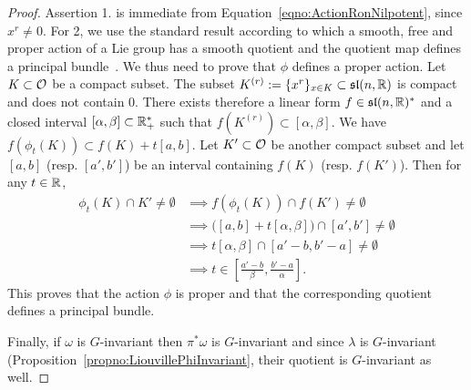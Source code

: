 \documentclass[english]{article}
\begin{document}
\begin{proof}
    Assertion 1. is immediate from Equation~\ref{eqno:ActionRonNilpotent}, since $x^r \neq 0$.
    For 2, we use the standard result according to which a smooth, free and proper action of a Lie group has a smooth quotient and the quotient map defines a principal bundle~\cite{LeeManifolds}. We thus need to prove that $\phi$ defines a proper action. Let $K \subset \mathcal{O}$ be a compact subset. The subset $K^{(r)}:=\{x^r\}_{x\in K} \subset \mathfrak{sl}(n, \mathbb{R})$ is compact and does not contain $0$. There exists therefore a linear form $f \in \mathfrak{sl}(n, \mathbb{R})^*$ and a closed interval $[\alpha, \beta]\subset \mathbb{R}^*_+$ such that $f(K^{(r)}) \subset [\alpha,\beta]$. We have $f(\phi_t (K)) \subset f(K) + t[a,b]$.
    Let $K' \subset \mathcal{O}$ be another compact subset and let $[a,b]$ (resp. $[a',b']$) be an interval containing $f(K)$ (resp. $f(K')$). Then for any $t\in \mathbb{R}$, 
    \[\begin{aligned}
        \phi_t (K) \cap  K' \neq \emptyset
        &\implies 
        f(\phi_t(K)) \cap  f(K') \neq \emptyset
        \\
        &\implies 
        \big([a, b] + t[\alpha, \beta] \big) \cap [a', b'] \neq \emptyset
        \\
        &\implies 
        t[\alpha, \beta] \cap [a' -b, b'-a] \neq \emptyset
        \\
        &\implies
        t \in \left[
            \frac{a'-b}{\beta}, 
            \frac{b'-a}{\alpha}
        \right] 
    .\end{aligned}\]
    This proves that the action $\phi$ is proper and that the corresponding quotient defines a principal bundle.

    Finally, if $\omega$ is $G$-invariant then $\pi^*\omega$ is $G$-invariant and since $\lambda$ is $G$-invariant (Proposition~\ref{propno:LiouvillePhiInvariant}, their quotient is $G$-invariant as well.
\end{proof}
\end{document}
